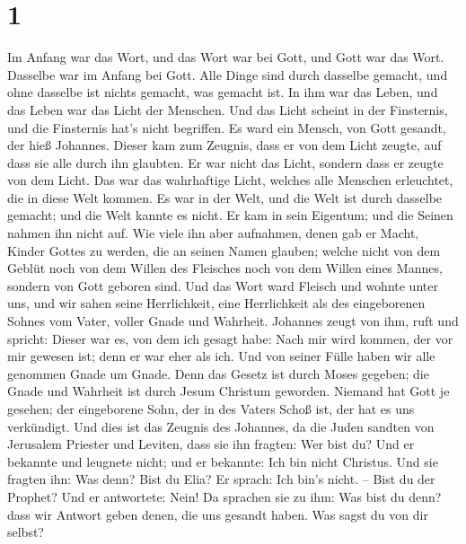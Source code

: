 \hypertarget{section}{%
\section{1}\label{section}}

 Im Anfang war das Wort, und das Wort war bei Gott, und Gott
war das Wort.  Dasselbe war im Anfang bei Gott. 
Alle Dinge sind durch dasselbe gemacht, und ohne dasselbe ist nichts
gemacht, was gemacht ist.  In ihm war das Leben, und das
Leben war das Licht der Menschen.  Und das Licht scheint in
der Finsternis, und die Finsternis hat's nicht begriffen. 
Es ward ein Mensch, von Gott gesandt, der hieß Johannes. 
Dieser kam zum Zeugnis, dass er von dem Licht zeugte, auf dass sie alle
durch ihn glaubten.  Er war nicht das Licht, sondern dass er
zeugte von dem Licht.  Das war das wahrhaftige Licht,
welches alle Menschen erleuchtet, die in diese Welt kommen.
 Es war in der Welt, und die Welt ist durch dasselbe
gemacht; und die Welt kannte es nicht.  Er kam in sein
Eigentum; und die Seinen nahmen ihn nicht auf.  Wie viele
ihn aber aufnahmen, denen gab er Macht, Kinder Gottes zu werden, die an
seinen Namen glauben;  welche nicht von dem Geblüt noch von
dem Willen des Fleisches noch von dem Willen eines Mannes, sondern von
Gott geboren sind.  Und das Wort ward Fleisch und wohnte
unter uns, und wir sahen seine Herrlichkeit, eine Herrlichkeit als des
eingeborenen Sohnes vom Vater, voller Gnade und Wahrheit. 
Johannes zeugt von ihm, ruft und spricht: Dieser war es, von dem ich
gesagt habe: Nach mir wird kommen, der vor mir gewesen ist; denn er war
eher als ich.  Und von seiner Fülle haben wir alle genommen
Gnade um Gnade.  Denn das Gesetz ist durch Moses gegeben;
die Gnade und Wahrheit ist durch Jesum Christum geworden. 
Niemand hat Gott je gesehen; der eingeborene Sohn, der in des Vaters
Schoß ist, der hat es uns verkündigt.  Und dies ist das
Zeugnis des Johannes, da die Juden sandten von Jerusalem Priester und
Leviten, dass sie ihn fragten: Wer bist du?  Und er
bekannte und leugnete nicht; und er bekannte: Ich bin nicht Christus.
 Und sie fragten ihn: Was denn? Bist du Elia? Er sprach:
Ich bin's nicht. -- Bist du der Prophet? Und er antwortete: Nein!
 Da sprachen sie zu ihm: Was bist du denn? dass wir Antwort
geben denen, die uns gesandt haben. Was sagst du von dir selbst?

